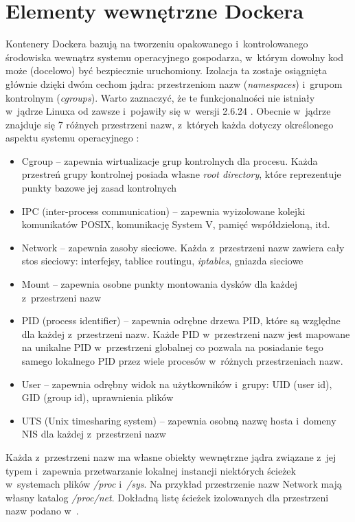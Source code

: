 \section{Elementy wewnętrzne Dockera}

Kontenery Dockera bazują na tworzeniu opakowanego i~kontrolowanego środowiska wewnątrz systemu operacyjnego gospodarza, w~którym dowolny kod może (docelowo) być bezpiecznie uruchomiony. Izolacja ta zostaje osiągnięta głównie dzięki dwóm cechom jądra: przestrzeniom nazw (\textit{namespaces}) i~grupom kontrolnym (\textit{cgroups}). Warto zaznaczyć, że te funkcjonalności nie istniały w~jądrze Linuxa od zawsze i~pojawiły się w~wersji 2.6.24 \cite{CorbetNotesFromContainer}. Obecnie w~jądrze znajduje się 7 różnych przestrzeni nazw, z~których każda dotyczy określonego aspektu systemu operacyjnego \cite{LinuxNamespaces}:
\begin{itemize}
  \item Cgroup -- zapewnia wirtualizacje grup kontrolnych dla procesu. Każda przestreń grupy kontrolnej posiada własne \textit{root directory}, które reprezentuje punkty bazowe jej zasad kontrolnych
  \item IPC (inter-process communication) -- zapewnia wyizolowane kolejki komunikatów POSIX, komunikację System V, pamięć współdzieloną, itd.
  \item Network -- zapewnia zasoby sieciowe. Każda z~przestrzeni nazw zawiera cały stos sieciowy: interfejsy, tablice routingu, \textit{iptables}, gniazda sieciowe
  \item Mount -- zapewnia osobne punkty montowania dysków dla każdej z~przestrzeni nazw
  \item PID (process identifier) -- zapewnia odrębne drzewa PID, które są względne dla każdej z~przestrzeni nazw. Każde PID w~przestrzeni nazw jest mapowane na unikalne PID w~przestrzeni globalnej co pozwala na posiadanie tego samego lokalnego PID przez wiele procesów w~różnych przestrzeniach nazw.
  \item User -- zapewnia odrębny widok na użytkowników i~grupy: UID (user id), GID (group id), uprawnienia plików
  \item UTS (Unix timesharing system) -- zapewnia osobną nazwę hosta i~domeny NIS dla każdej z~przestrzeni nazw
\end{itemize}

Każda z~przestrzeni nazw ma własne obiekty wewnętrzne jądra związane z~jej typem i~zapewnia przetwarzanie lokalnej instancji niektórych ścieżek w~systemach plików \textit{/proc} i~\textit{/sys}. Na przykład przestrzenie nazw Network mają własny katalog \textit{/proc/net}. Dokładną listę ścieżek izolowanych dla przestrzeni nazw podano w~\cite{LinuxNamespaces}.

